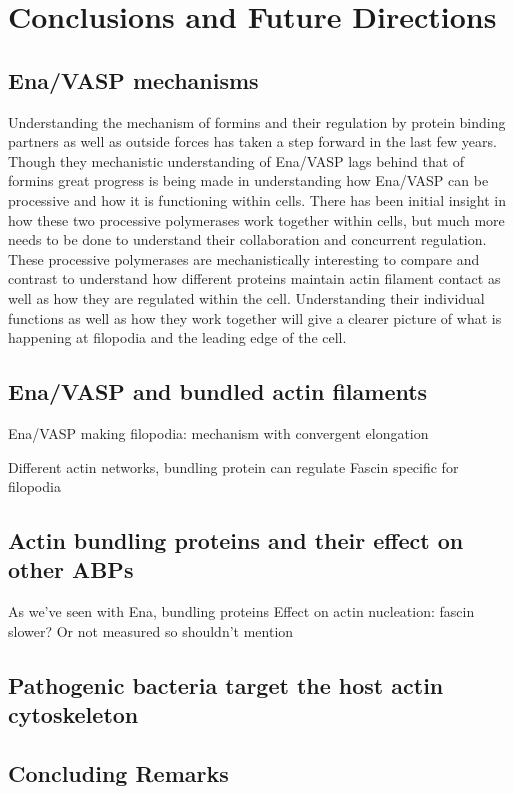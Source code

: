 \chapter{Conclusions and Future Directions}\label{ch:conclusions}

\section{Ena/VASP mechanisms}\label{ena-mechanism-conclusions}
Understanding the mechanism of formins and their regulation by protein binding partners as well as outside forces has taken a step forward in the last few years. Though they mechanistic understanding of Ena/VASP lags behind that of formins great progress is being made in understanding how Ena/VASP can be processive and how it is functioning within cells. There has been initial insight in how these two processive polymerases work together within cells, but much more needs to be done to understand their collaboration and concurrent regulation. These processive polymerases are mechanistically interesting to compare and contrast to understand how different proteins maintain actin filament contact as well as how they are regulated within the cell. Understanding their individual functions as well as how they work together will give a clearer picture of what is happening at filopodia and the leading edge of the cell. 

\section{Ena/VASP and bundled actin filaments}\label{ena-bundles-conclusions}
Ena/VASP making filopodia:
mechanism with convergent elongation

Different actin networks, bundling protein can regulate
Fascin specific for filopodia

\section{Actin bundling proteins and their effect on other ABPs}\label{bundler-conclusions}

As we've seen with Ena, bundling proteins 
Effect on actin nucleation: fascin slower? Or not measured so shouldn't mention

\section{Pathogenic bacteria target the host actin cytoskeleton}\label{bacteria-conclusions}

\section{Concluding Remarks}\label{final-conclusions}
